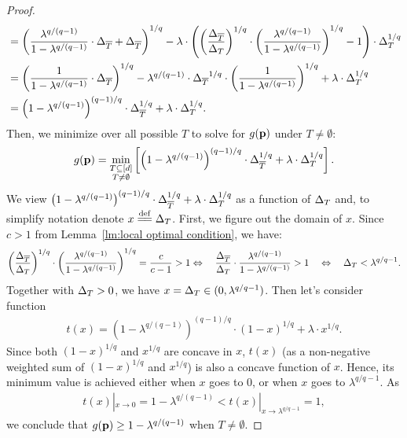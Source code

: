 \begin{proof}
\begin{align*}
&=\left(\frac{\lambda^{q/(q-1)}}{1-\lambda^{q/(q-1)}}\cdot{\Delta_{{\overline{T}}}}+{\Delta_{{\overline{T}}}}\right)^{1/q}-\lambda\cdot\left(\left(\frac{{\Delta_{{\overline{T}}}}}{\Delta_{{T}}}\right)^{1/q}\cdot\left(\frac{\lambda^{q/(q-1)}}{1-\lambda^{q/(q-1)}}\right)^{1/q}-1\right)\cdot \Delta_{{T}}^{1/q}\\
&=\left(\frac{1}{1-\lambda^{q/(q-1)}}\cdot{\Delta_{{\overline{T}}}}\right)^{1/q}-\lambda^{q/(q-1)}\cdot {\Delta_{{\overline{T}}}}^{1/q}\cdot\left(\frac{1}{1-\lambda^{q/(q-1)}}\right)^{1/q}+\lambda\cdot\Delta_{{T}}^{1/q}\\
&=\left(1-\lambda^{q/(q-1)}\right)^{(q-1)/q}\cdot\Delta_{\overline{T}}^{1/q}+\lambda\cdot\Delta_{T}^{1/q}.
\end{align*}
Then, we minimize over all possible $T$ to solve for $g(\mathbf{p})$ under $T\neq\emptyset$:
\begin{align*}
g(\mathbf{p})=\min\limits_{\substack{T\subseteq[d]\\T\neq\emptyset}}\left[\left(1-\lambda^{q/(q-1)}\right)^{(q-1)/q}\cdot\Delta_{\overline{T}}^{1/q}+\lambda\cdot\Delta_{T}^{1/q}\right].
\end{align*}
We view $\left(1-\lambda^{q/(q-1)}\right)^{(q-1)/q}\cdot\Delta_{\overline{T}}^{1/q}+\lambda\cdot\Delta_{T}^{1/q}$ as a function of $\Delta_{{T}}$ and, to simplify notation denote $x\overset{\mathrm{def}}{=\mathrel{\mkern-3mu}=}\Delta_{{T}}$. First, we figure out the domain of $x$. Since $c>1$ from Lemma~\ref{lm:local optimal condition}, we have:
\begin{align*}
    \left(\frac{{\Delta_{{\overline{T}}}}}{\Delta_{{T}}}\right)^{1/q}\cdot\left(\frac{\lambda^{q/(q-1)}}{1-\lambda^{q/(q-1)}}\right)^{1/q}=\frac{c}{c-1}>1
\Leftrightarrow\quad \frac{{\Delta_{{\overline{T}}}}}{\Delta_{{T}}}\cdot\frac{\lambda^{q/(q-1)}}{1-\lambda^{q/(q-1)}}>1
\quad\Leftrightarrow\quad \Delta_{{T}}<\lambda^{q/q-1}.
\end{align*}
Together with $\Delta_{{T}}>0$, we have $x=\Delta_{{T}}\in(0,\lambda^{q/q-1})$. Then let's consider function
\begin{align*}
    t(x)=\left(1-\lambda^{q/(q-1)}\right)^{(q-1)/q}\cdot(1-x)^{1/q}+\lambda\cdot x^{1/q}.
\end{align*}
Since both $(1-x)^{1/q}$ and $x^{1/q}$ are concave in $x$, $t(x)$ (as a non-negative weighted sum of $(1-x)^{1/q}$ and $x^{1/q}$) is also a concave function of $x$. Hence, its minimum value is achieved either when $x$ goes to $0$, or when $x$ goes to $\lambda^{q/q-1}$. As
\begin{align*}
    t(x)\left\vert_{x\rightarrow 0}=1-\lambda^{q/(q-1)}<t(x)\right\vert_{x\rightarrow \lambda^{q/q-1}}=1, 
\end{align*}
we conclude that $g(\mathbf{p})\geq1-\lambda^{q/(q-1)}$ when $T\neq\emptyset$.
\end{proof}

